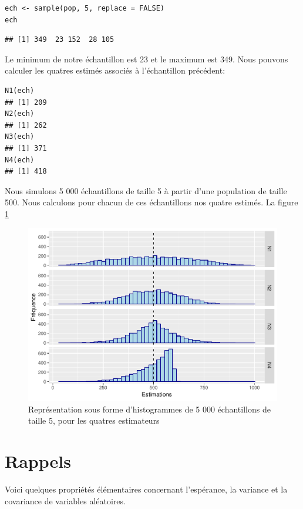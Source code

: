 \documentclass[10pt]{article}
\begin{document}
\begin{verbatim}
ech <- sample(pop, 5, replace = FALSE)
ech
\end{verbatim}

\begin{verbatim}
## [1] 349  23 152  28 105
\end{verbatim}

Le minimum de notre échantillon est 23 et le maximum est 349. Nous
pouvons calculer les quatres estimés associés à l'échantillon précédent:

\begin{verbatim}
N1(ech)
## [1] 209
N2(ech)
## [1] 262
N3(ech)
## [1] 371
N4(ech)
## [1] 418
\end{verbatim}

Nous simulons 5 000 échantillons de taille 5 à partir d'une population
de taille 500. Nous calculons pour chacun de ces échantillons nos quatre
estimés. La figure \ref{fig:ech-taille-5}

\begin{figure}
\includegraphics[width=0.9\linewidth]{serial_number_amq_files/figure-latex/ech-taille-5-1} \caption{Représentation sous forme d'histogrammes de 5 000 échantillons de taille 5, pour les quatres estimateurs}\label{fig:ech-taille-5}
\end{figure}

\appendix

\hypertarget{rappels}{%
\section{\texorpdfstring{Rappels
\label{rappel_esperance}}{Rappels }}\label{rappels}}

Voici quelques propriétés élémentaires concernant l'espérance, la
variance et la covariance de variables aléatoires.
\end{document}
